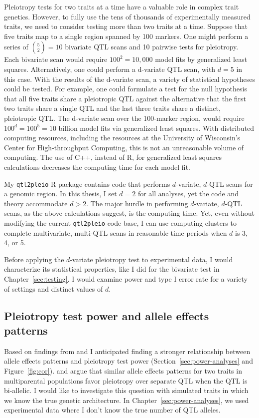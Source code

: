 Pleiotropy tests for two traits at a time have a valuable role in complex trait genetics. However, to 
fully use the tens of thousands of experimentally measured traits, we need to consider testing more than 
two traits at a time. Suppose that five traits map to a single region spanned by 100 markers. One might 
perform a series of $\binom{5}{2} = 10$ bivariate QTL scans and 10 pairwise tests for pleiotropy. Each 
bivariate scan would require $100^2 = 10,000$ model fits by generalized least squares. Alternatively, one 
could perform a d-variate QTL scan, with $d=5$ in this case. With the results of the d-variate scan, a 
variety of statistical hypotheses could be tested. For example, one could formulate a test for the null 
hypothesis that all five traits share a pleiotropic QTL against the alternative that the first two traits 
share a single QTL and the last three traits share a distinct, pleiotropic QTL. The d-variate scan over 
the 100-marker region, would require $100^d = 100^5 = 10$ billion model fits via generalized least 
squares. With distributed computing resources, including the resources at the University of Wisconsin's 
Center for High-throughput Computing, this is not an unreasonable volume of computing. The use of C++, instead of R, for 
generalized least squares calculations decreases the computing time for each model fit. 

My \texttt{qtl2pleio} R package contains code that performs $d$-variate, $d$-QTL scans for a 
genomic region. In this thesis, I set $d = 2$ for all analyses, yet the code and theory 
accommodate $d > 2$. The major hurdle in performing $d$-variate, $d$-QTL scans, as the above 
calculations suggest, is the computing time. Yet, even without modifying the current 
\texttt{qtl2pleio} code base, I can use computing clusters to complete multivariate, multi-QTL scans in reasonable time periods when $d$ is 3, 4, or 5. 

Before applying the $d$-variate pleiotropy test to experimental data, I would characterize its
statistical properties, like I did for the bivariate test in Chapter~\ref{sec:testing}. I would examine power and type I error rate for a variety of settings and distinct values of $d$. 

\subsection{Pleiotropy test power and allele effects patterns}

Based on findings from \citet{macdonald2007joint} and \citet{king2012genetic} I anticipated finding a stronger relationship between allele effects patterns and pleiotropy test power (Section~\ref{sec:power-analyses} and Figure~\ref{fig:cor}). \citet{macdonald2007joint} and \citet{king2012genetic} argue that similar allele effects patterns for two traits in multiparental populations favor pleiotropy over separate QTL when the QTL is bi-allelic. I would like to investigate this question with simulated traits in which we know the true genetic architecture. In Chapter~\ref{sec:power-analyses}, we used experimental data where I don't know the true number of QTL alleles. 


